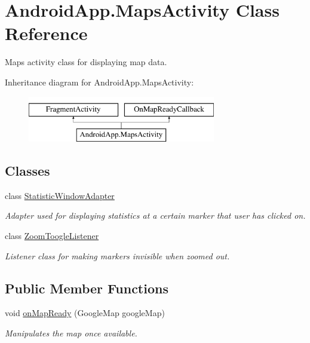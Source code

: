 \hypertarget{class_android_app_1_1_maps_activity}{}\section{Android\+App.\+Maps\+Activity Class Reference}
\label{class_android_app_1_1_maps_activity}


Maps activity class for displaying map data.  


Inheritance diagram for Android\+App.\+Maps\+Activity\+:\begin{figure}[H]
\begin{center}
\leavevmode
\includegraphics[height=2.000000cm]{class_android_app_1_1_maps_activity}
\end{center}
\end{figure}
\subsection*{Classes}
\begin{DoxyCompactItemize}
\item 
class \hyperlink{class_android_app_1_1_maps_activity_1_1_statistic_window_adapter}{Statistic\+Window\+Adapter}
\begin{DoxyCompactList}\small\item\em Adapter used for displaying statistics at a certain marker that user has clicked on. \end{DoxyCompactList}\item 
class \hyperlink{class_android_app_1_1_maps_activity_1_1_zoom_toogle_listener}{Zoom\+Toogle\+Listener}
\begin{DoxyCompactList}\small\item\em Listener class for making markers invisible when zoomed out. \end{DoxyCompactList}\end{DoxyCompactItemize}
\subsection*{Public Member Functions}
\begin{DoxyCompactItemize}
\item 
void \hyperlink{class_android_app_1_1_maps_activity_abee115dd67628da8e1140430428ce112}{on\+Map\+Ready} (Google\+Map google\+Map)
\begin{DoxyCompactList}\small\item\em Manipulates the map once available. \end{DoxyCompactList}\end{DoxyCompactItemize}
